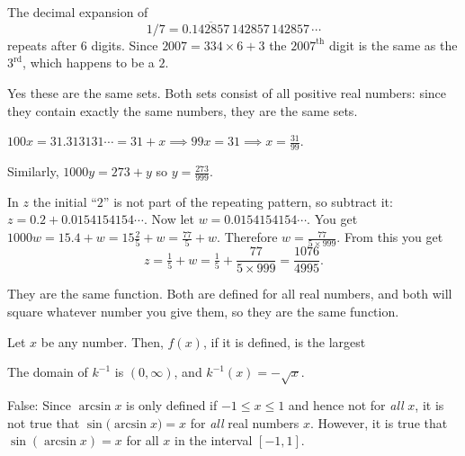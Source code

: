 \relax
{}

\item[{\bfseries(I2.1)}]

The decimal expansion of
\[
1/7 = 0.\overline{142857}\,142857\,142857\,\cdots
\]
repeats after 6 digits.  Since $2007 =
334\times6+3$ the $2007^{\textrm{th}}$ digit is the same as the
$3^{\textrm{rd}}$, which happens to be a $2$.
\bigskip

\item[{\bfseries(I2.5)}]

Yes these are the same sets.  Both sets consist of all positive real
numbers: since they contain exactly the same numbers, they are the
same sets.
\bigskip

\item[{\bfseries(I2.6)}]

$100x = 31.313131\cdots = 31+x \implies 99x = 31 \implies x =
\frac{31}{99}$.

Similarly, $1000y = 273 + y$ so $y= \frac{273}{999}$.

In $z$ the initial ``$2$'' is not part of the repeating pattern, so
subtract it:  $z = 0.2 + 0.0154154154\cdots$.  Now let
$w=0.0154154154\cdots$.  You get $1000w = 15.4+w = 15\frac25 + w =
\frac{77}{5}+w$. Therefore $w= \frac{77}{5\times 999}$.
From this you get
\[
z = \tfrac15+w = \tfrac15 +  \frac{77}{5\times999} = \frac{1076}{4995}.
\]
\bigskip

\item[{\bfseries(I7.1)}]

  They are the same function.  Both are defined for all real numbers,
  and both will square whatever number you give them, so they are the
  same function.
\bigskip

\item[{\bfseries(I7.4)}]

Let $x$ be any number.  Then, $f(x)$, if it is defined, is the largest

\bigskip

\item[{\bfseries(I7.6)}]

The domain of $k^{-1} $ is $(0, \infty)$, and $k^{-1}(x) = -\sqrt{x}$.
\bigskip

\item[{\bfseries(I7.8a)}]

False: Since $\arcsin x$ is only defined if $-1\leq x\leq 1$ and hence
not for \emph{all} $x$, it is not true that $\sin\bigl(\arcsin
x\bigr) = x$ for \emph{all} real numbers $x$.
However, it is true that $\sin(\arcsin x) = x$ for all $x$ in
the interval $[-1,1]$.
\bigskip

